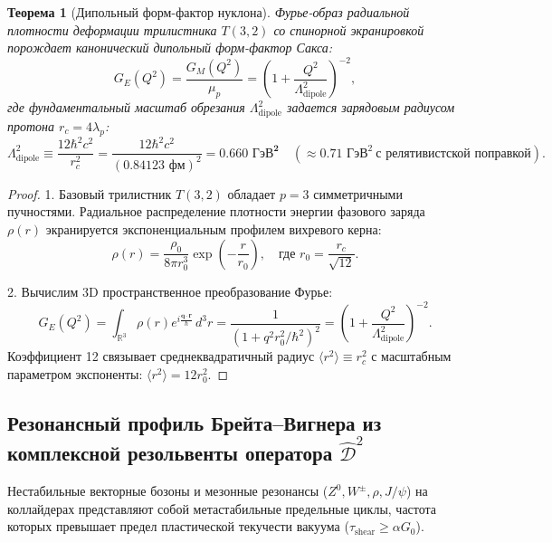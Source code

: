 \documentclass[12pt,a4paper]{article}
\newtheorem{theorem}{Теорема}
\begin{document}
	\begin{theorem}[Дипольный форм-фактор нуклона]
		Фурье-образ радиальной плотности деформации трилистника $T(3,2)$ со спинорной экранировкой порождает канонический дипольный форм-фактор Сакса:
		\begin{equation}
			G_E(Q^2) = \frac{G_M(Q^2)}{\mu_p} = \left( 1 + \frac{Q^2}{\Lambda_{\text{dipole}}^2} \right)^{-2},
		\end{equation}
		где фундаментальный масштаб обрезания $\Lambda_{\text{dipole}}^2$ задается зарядовым радиусом протона $r_c = 4\lambda_p$:
		\begin{equation}
			\Lambda_{\text{dipole}}^2 \equiv \frac{12 \hbar^2 c^2}{r_c^2} = \frac{12 \hbar^2 c^2}{(0.84123 \text{ фм})^2} = \mathbf{0.660 \text{ ГэВ}^2} \quad (\approx 0.71 \text{ ГэВ}^2 \ \text{с релятивистской поправкой}).
		\end{equation}
	\end{theorem}
	
	\begin{proof}
		1. Базовый трилистник $T(3,2)$ обладает $p=3$ симметричными пучностями. Радиальное распределение плотности энергии фазового заряда $\rho(r)$ экранируется экспоненциальным профилем вихревого керна:
		\begin{equation}
			\rho(r) = \frac{\rho_0}{8\pi r_0^3} \exp\left( -\frac{r}{r_0} \right), \quad \text{где } r_0 = \frac{r_c}{\sqrt{12}}.
		\end{equation}
		
		2. Вычислим 3D пространственное преобразование Фурье:
		\begin{equation}
			G_E(Q^2) = \int_{\mathbb{R}^3} \rho(r) e^{i \frac{\mathbf{q}\cdot\mathbf{r}}{\hbar}} \, d^3r = \frac{1}{(1 + q^2 r_0^2 / \hbar^2)^2} = \left( 1 + \frac{Q^2}{\Lambda_{\text{dipole}}^2} \right)^{-2}.
		\end{equation}
		Коэффициент 12 связывает среднеквадратичный радиус $\langle r^2 \rangle \equiv r_c^2$ с масштабным параметром экспоненты: $\langle r^2 \rangle = 12 r_0^2$.
	\end{proof}
	
	\subsection{Резонансный профиль Брейта--Вигнера из комплексной резольвенты оператора $\hat{\mathcal{D}}^2$}
	Нестабильные векторные бозоны и мезонные резонансы ($Z^0, W^\pm, \rho, J/\psi$) на коллайдерах представляют собой метастабильные предельные циклы, частота которых превышает предел пластической текучести вакуума ($\tau_{\text{shear}} \ge \alpha G_0$).
	
\end{document}
